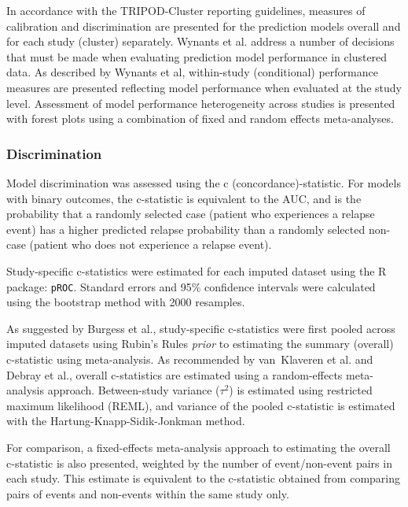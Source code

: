 In accordance with the TRIPOD-Cluster reporting guidelines, measures of calibration and discrimination are presented for the prediction models overall and for each study (cluster) separately\cite{debray2023}. Wynants et al. address a number of decisions that must be made when evaluating prediction model performance in clustered data\cite{wynants2018}. As described by Wynants et al, within-study (conditional) performance measures are presented reflecting model performance when evaluated at the study level\cite{wynants2018,van-klaveren2014}. Assessment of model performance heterogeneity across studies is presented with forest plots using a combination of fixed and random effects meta-analyses\cite{debray2017,van-klaveren2014}.

\subsubsection{\label{meth:discrimination}Discrimination}

Model discrimination was assessed using the c (concordance)-statistic. For models with binary outcomes, the c-statistic is equivalent to the AUC, and is the probability that a randomly selected case (patient who experiences a relapse event) has a higher predicted relapse probability than a randomly selected non-case (patient who does not experience a relapse event).

Study-specific c-statistics were estimated for each imputed dataset using the R package: \texttt{pROC}\cite{proc2011}. Standard errors and 95\% confidence intervals were calculated using the bootstrap method with 2000 resamples.

As suggested by Burgess et al., study-specific c-statistics were first pooled across imputed datasets using Rubin's Rules \textit{prior} to estimating the summary (overall) c-statistic using meta-analysis\cite{burgess2013}. As recommended by van~Klaveren et al.\cite{van-klaveren2014} and Debray et al.\cite{debray2017}, overall c-statistics are estimated using a random-effects meta-analysis approach. Between-study variance ($\tau^2$) is estimated using restricted maximum likelihood (REML), and variance of the pooled c-statistic is estimated with the Hartung-Knapp-Sidik-Jonkman method\cite{knapp2003}.

For comparison, a fixed-effects meta-analysis approach to estimating the overall c-statistic is also presented, weighted by the number of event/non-event pairs in each study. This estimate is equivalent to the c-statistic obtained from comparing pairs of events and non-events within the same study only\cite{wynants2018, vanoirbeek2012}.


